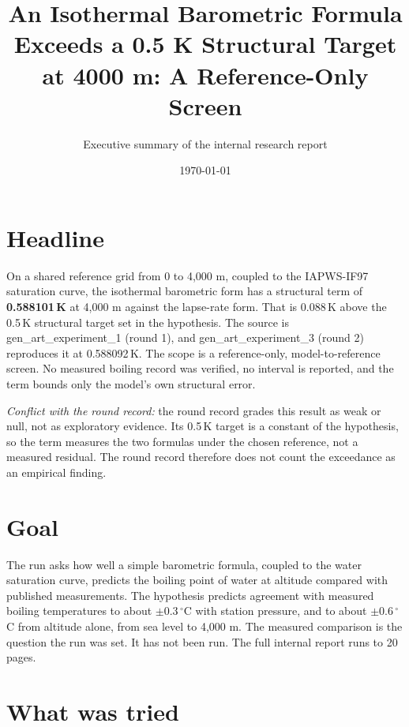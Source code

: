 \documentclass[11pt,letterpaper]{article}
\title{An Isothermal Barometric Formula Exceeds a 0.5 K Structural Target at 4000 m: A Reference-Only Screen}
\author{Executive summary of the internal research report}
\date{\today}
\begin{document}
\maketitle

\section{Headline}

On a shared reference grid from 0 to 4,000 m, coupled to the IAPWS-IF97 saturation curve, the isothermal barometric form has a structural term of \textbf{0.588101\,K} at 4,000 m against the lapse-rate form. That is 0.088\,K above the 0.5\,K structural target set in the hypothesis. The source is gen\_art\_\allowbreak{}experiment\_1 (round 1), and gen\_art\_\allowbreak{}experiment\_3 (round 2) reproduces it at 0.588092\,K. The scope is a reference-only, model-to-reference screen. No measured boiling record was verified, no interval is reported, and the term bounds only the model's own structural error.

\emph{Conflict with the round record:} the round record grades this result as weak or null, not as exploratory evidence. Its 0.5\,K target is a constant of the hypothesis, so the term measures the two formulas under the chosen reference, not a measured residual. The round record therefore does not count the exceedance as an empirical finding.

\section{Goal}

The run asks how well a simple barometric formula, coupled to the water saturation curve, predicts the boiling point of water at altitude compared with published measurements. The hypothesis predicts agreement with measured boiling temperatures to about $\pm 0.3$\,$^\circ$C with station pressure, and to about $\pm 0.6$\,$^\circ$C from altitude alone, from sea level to 4,000 m. The measured comparison is the question the run was set. It has not been run. The full internal report runs to 20 pages.

\section{What was tried}
\end{document}
